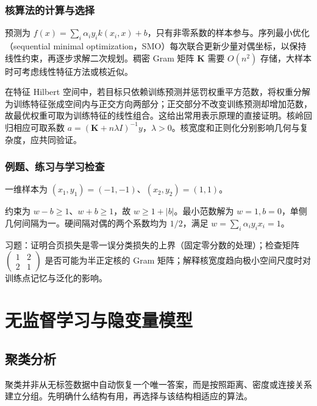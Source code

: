 \documentclass[UTF8,12pt,a4paper,fontset=fandol]{ctexbook}
\begin{document}
\section{核算法的计算与选择}

预测为 $f(x)=\sum_i\alpha_iy_ik(x_i,x)+b$，只有非零系数的样本参与。序列最小优化（sequential minimal optimization，SMO）每次联合更新少量对偶坐标，以保持线性约束，再逐步求解二次规划。稠密 Gram 矩阵 $\mathbf K$ 需要 $O(n^2)$ 存储，大样本时可考虑线性特征方法或核近似。

在特征 Hilbert 空间中，若目标只依赖训练预测并惩罚权重平方范数，将权重分解为训练特征张成空间内与正交方向两部分；正交部分不改变训练预测却增加范数，故最优权重可取为训练特征的线性组合。这给出常用表示原理的直接证明。核岭回归相应可取系数 $a=(\mathbf K+n\lambda I)^{-1}y$，$\lambda>0$。核宽度和正则化分别影响几何与复杂度，应共同验证。

\section{例题、练习与学习检查}

\begin{example}[两个点的最大间隔]
一维样本为 $(x_1,y_1)=(-1,-1)$、$(x_2,y_2)=(1,1)$。
\end{example}
\begin{solve}
约束为 $w-b\geq1$、$w+b\geq1$，故 $w\geq1+|b|$。最小范数解为 $w=1,b=0$，单侧几何间隔为一。硬间隔对偶的两个系数均为 $1/2$，满足 $w=\sum_i\alpha_iy_ix_i=1$。
\end{solve}

习题：证明合页损失是零一误分类损失的上界（固定零分数的处理）；检查矩阵 $\left(\begin{smallmatrix}1&2\\2&1\end{smallmatrix}\right)$ 是否可能为半正定核的 Gram 矩阵；解释核宽度趋向极小空间尺度时对训练点记忆与泛化的影响。

\part{无监督学习与隐变量模型}

\chapter{聚类分析}
\label{chap:ml-clustering}

聚类并非从无标签数据中自动恢复一个唯一答案，而是按照距离、密度或连接关系建立分组。先明确什么结构有用，再选择与该结构相适应的算法。
\end{document}
